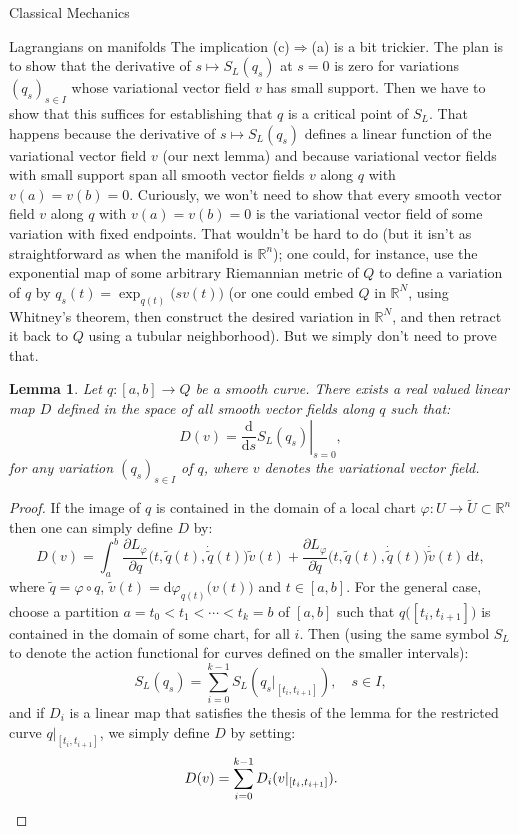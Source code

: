 \documentclass[oneside,a4paper,11pt]{amsbook}
\newcommand{\R}{\mathds R}
\newcommand{\dd}{\mathrm d}
\theoremstyle{remark}\newtheorem{exercise}{Exercise}[chapter]
\theoremstyle{plain}\newtheorem{teo}{Theorem}[section]
\theoremstyle{plain}\newtheorem{lem}[teo]{Lemma}
\theoremstyle{plain}\newtheorem{prop}[teo]{Proposition}
\theoremstyle{plain}\newtheorem{cor}[teo]{Corollary}
\theoremstyle{definition}\newtheorem{defin}[teo]{Definition}
\theoremstyle{remark}\newtheorem{rem}[teo]{Remark}
\theoremstyle{definition}\newtheorem{notation}[teo]{Notation}
\theoremstyle{definition}\newtheorem{convention}[teo]{Convention}
\theoremstyle{definition}\newtheorem{example}[teo]{Example}
\numberwithin{section}{chapter}
\numberwithin{equation}{section}
\begin{document}
\begin{chapter}{Classical Mechanics}
\begin{section}{Lagrangians on manifolds}
The implication (c)$\Rightarrow$(a) is a bit trickier. The plan is to show that the derivative of $s\mapsto S_L(q_s)$
at $s=0$ is zero for variations $(q_s)_{s\in I}$ whose variational vector field $v$ has small support. Then we have
to show that this suffices for establishing that $q$ is a critical point of $S_L$.
That happens because the derivative of $s\mapsto S_L(q_s)$ defines a linear function
of the variational vector field $v$ (our next lemma) and because variational vector fields with small support
span all smooth vector fields $v$ along $q$ with $v(a)=v(b)=0$.
Curiously, we won't need to show that every smooth vector field $v$ along $q$
with $v(a)=v(b)=0$ is the variational vector field of some variation with fixed endpoints. That wouldn't be hard
to do (but it isn't as straightforward as when the manifold is $\R^n$); one could, for instance, use the exponential
map of some arbitrary Riemannian metric of $Q$ to define a variation of $q$ by $q_s(t)=\exp_{q(t)}\!\big(sv(t)\big)$
(or one could embed $Q$ in $\R^N$, using Whitney's theorem, then construct
the desired variation in $\R^N$, and then retract it back to $Q$ using a tubular neighborhood).
But we simply don't need to prove that.

\begin{lem}\label{thm:dSLlinear}
Let $q:[a,b]\to Q$ be a smooth curve. There exists a real valued linear map $D$ defined in the space
of all smooth vector fields along $q$ such that:
\[D(v)=\left.\frac{\dd}{\dd s}S_L(q_s)\right\vert_{s=0},\]
for any variation $(q_s)_{s\in I}$ of $q$, where $v$ denotes the variational vector field.
\end{lem}
\begin{proof}
If the image of $q$ is contained in the domain of a local chart $\varphi:U\to\widetilde U\subset\R^n$ then
one can simply define $D$ by:
\[D(v)=\int_a^b\frac{\partial L_\varphi}{\partial q}\big(t,\tilde q(t),\dot{\tilde q}(t)\big)\tilde v(t)+
\frac{\partial L_\varphi}{\partial\dot q}\big(t,\tilde q(t),\dot{\tilde q}(t)\big)\dot{\tilde v}(t)\,\dd t,\]
where $\tilde q=\varphi\circ q$, $\tilde v(t)=\dd\varphi_{q(t)}\big(v(t)\big)$ and $t\in[a,b]$.
For the general case, choose a partition
$a=t_0<t_1<\cdots<t_k=b$ of $[a,b]$ such that $q\big([t_i,t_{i+1}]\big)$ is contained in the domain of some chart,
for all $i$. Then (using the same symbol $S_L$ to denote the action functional for curves defined on the smaller intervals):
\[S_L(q_s)=\sum_{i=0}^{k-1}S_L(q_s\vert_{[t_i,t_{i+1}]}),\quad s\in I,\]
and if $D_i$ is a linear map that satisfies the thesis of the lemma for the restricted curve $q\vert_{[t_i,t_{i+1}]}$,
we simply define $D$ by setting:
\[D(v)=\sum_{i=0}^{k-1}D_i(v\vert_{[t_i,t_{i+1}]}).\qedhere\]
\end{proof}


\end{section}
\end{chapter}
\end{document}

